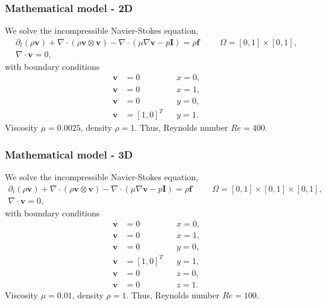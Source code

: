 \subsubsection{Mathematical model - 2D}
%
We solve the incompressible Navier-Stokes equation,
%
\begin{align}
    \partial_{t} (\rho \boldsymbol{v}) + \nabla \cdot (\rho \boldsymbol{v} \otimes \boldsymbol{v}) - \nabla \cdot (\mu \nabla \boldsymbol{v} - p \boldsymbol{I}) = \rho \boldsymbol{f} & &&\Omega = [0, 1] \times [0, 1], \\
    \nabla \cdot \boldsymbol{v} = 0,
\end{align}
%
with boundary conditions
%
\begin{align}
    \boldsymbol{v} &= 0         &&x = 0, \\
    \boldsymbol{v} &= 0         &&x = 1, \\
    \boldsymbol{v} &= 0         &&y = 0, \\
    \boldsymbol{v} &= [1, 0]^T  &&y = 1.
\end{align}
%
Viscosity $\mu = 0.0025$, density $\rho = 1$. Thus, Reynolds number $Re = 400$.
%
%
\subsubsection{Mathematical model - 3D}
%
We solve the incompressible Navier-Stokes equation,
%
\begin{align}
    \partial_{t} (\rho \boldsymbol{v}) + \nabla \cdot (\rho \boldsymbol{v} \otimes \boldsymbol{v}) - \nabla \cdot (\mu \nabla \boldsymbol{v} - p \boldsymbol{I}) = \rho \boldsymbol{f} & &&\Omega = [0, 1] \times [0, 1] \times [0, 1], \\
    \nabla \cdot \boldsymbol{v} = 0,
\end{align}
%
with boundary conditions
%
\begin{align}
    \boldsymbol{v} &= 0         &&x = 0, \\
    \boldsymbol{v} &= 0         &&x = 1, \\
    \boldsymbol{v} &= 0         &&y = 0, \\
    \boldsymbol{v} &= [1, 0]^T  &&y = 1, \\
    \boldsymbol{v} &= 0         &&z = 0, \\
    \boldsymbol{v} &= 0         &&z = 1.
\end{align}
%
Viscosity $\mu = 0.01$, density $\rho = 1$. Thus, Reynolds number $Re = 100$.
%
%

